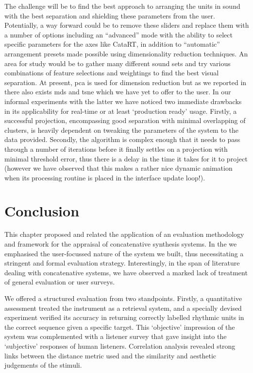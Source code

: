 The challenge will be to find the best approach to arranging the units in sound with the best separation and shielding these parameters from the user. Potentially, a way forward could be to remove these sliders and replace them with a number of options including an ``advanced'' mode with the ability to select specific parameters for the axes like CataRT, in addition to “automatic” arrangement presets made possible using dimensionality reduction techniques. An area for study would be to gather many different sound sets and try various combinations of feature selections and weightings to find the best visual separation. At present, \acrshort{pca} is used for dimension reduction but as we reported in  there also exists \acrshort{mds} and \acrshort{tsne} which we have yet to offer to the user. In our informal experiments with the latter we have noticed two immediate drawbacks in its applicability for real-time or at least `production ready' usage. Firstly, a successful projection, encompassing good separation with minimal overlapping of clusters, is heavily dependent on tweaking the parameters of the system to the data provided. Secondly, the algorithm is complex enough that it needs to pass through a number of iterations before it finally settles on a projection with minimal threshold error, thus there is a delay in the time it takes for it to project (however we have observed that this makes a rather nice dynamic animation when its processing routine is placed in the interface update loop!). 

\section{Conclusion}

This chapter proposed and related the application of an evaluation methodology and framework for the appraisal of concatenative synthesis systems. In the  we emphasised the user-focussed nature of the system we built, thus necessitating a stringent and formal evaluation strategy. Interestingly, in the span of literature dealing with concatenative systems, we have observed a marked lack of treatment of general evaluation or user surveys.

We offered a structured evaluation from two standpoints. Firstly, a quantitative assessment treated the instrument as a retrieval system, and a specially devised experiment verified its accuracy in returning correctly labelled rhythmic units in the correct sequence given a specific target. This `objective' impression of the system was complemented with a listener survey that gave insight into the `subjective' responses of human listeners. Correlation analysis revealed strong links between the distance metric used and the similarity and aesthetic judgements of the stimuli.

